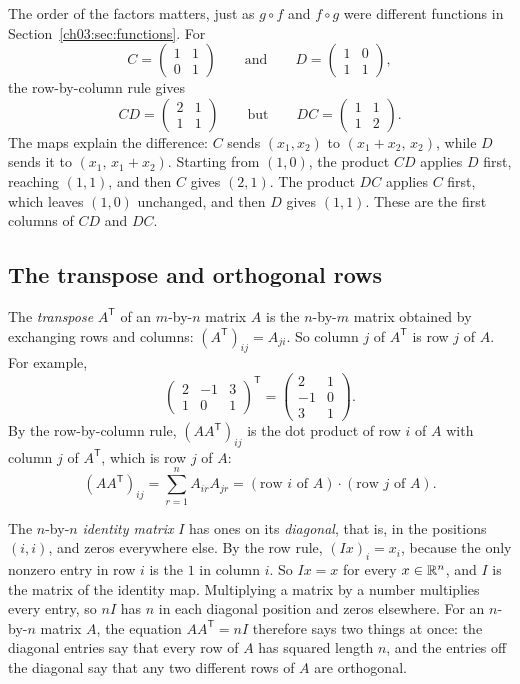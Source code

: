 The order of the factors matters, just as $g\circ f$ and $f\circ g$ were different functions in Section~\ref{ch03:sec:functions}. For
\[
C=\begin{pmatrix}1&1\\0&1\end{pmatrix}\qquad\text{and}\qquad D=\begin{pmatrix}1&0\\1&1\end{pmatrix},
\]
the row-by-column rule gives
\[
CD=\begin{pmatrix}2&1\\1&1\end{pmatrix}\qquad\text{but}\qquad DC=\begin{pmatrix}1&1\\1&2\end{pmatrix}.
\]
The maps explain the difference: $C$ sends $(x_1,x_2)$ to $(x_1+x_2,\,x_2)$, while $D$ sends it to $(x_1,\,x_1+x_2)$. Starting from $(1,0)$, the product $CD$ applies $D$ first, reaching $(1,1)$, and then $C$ gives $(2,1)$. The product $DC$ applies $C$ first, which leaves $(1,0)$ unchanged, and then $D$ gives $(1,1)$. These are the first columns of $CD$ and $DC$.

\subsection*{The transpose and orthogonal rows}
The \emph{transpose} $A^{\mathsf T}$ of an $m$-by-$n$ matrix $A$ is the $n$-by-$m$ matrix obtained by exchanging rows and columns: $(A^{\mathsf T})_{ij}=A_{ji}$. So column $j$ of $A^{\mathsf T}$ is row $j$ of $A$. For example,
\[
\begin{pmatrix}2&-1&3\\1&0&1\end{pmatrix}^{\mathsf T}=\begin{pmatrix}2&1\\-1&0\\3&1\end{pmatrix}.
\]
By the row-by-column rule, $(AA^{\mathsf T})_{ij}$ is the dot product of row $i$ of $A$ with column $j$ of $A^{\mathsf T}$, which is row $j$ of $A$:
\[
(AA^{\mathsf T})_{ij}=\sum_{r=1}^n A_{ir}A_{jr}=(\text{row $i$ of $A$})\cdot(\text{row $j$ of $A$}).
\]

The $n$-by-$n$ \emph{identity matrix} $I$ has ones on its \emph{diagonal}, that is, in the positions $(i,i)$, and zeros everywhere else. By the row rule, $(Ix)_i=x_i$, because the only nonzero entry in row $i$ is the $1$ in column $i$. So $Ix=x$ for every $x\in\mathbb R^n$, and $I$ is the matrix of the identity map. Multiplying a matrix by a number multiplies every entry, so $nI$ has $n$ in each diagonal position and zeros elsewhere. For an $n$-by-$n$ matrix $A$, the equation $AA^{\mathsf T}=nI$ therefore says two things at once: the diagonal entries say that every row of $A$ has squared length $n$, and the entries off the diagonal say that any two different rows of $A$ are orthogonal.

